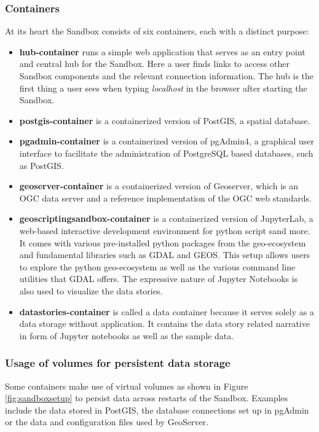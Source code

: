 \documentclass[11pt, a4paper, oneside, parskip=full-]{scrartcl}
\begin{document}
\subsubsection*{Containers}
At its heart the Sandbox consists of six containers, each with a distinct
purpose:

\begin{itemize}
  \item \textbf{hub-container} runs a simple web application that serves as an
  entry point and central hub for the Sandbox. Here a user finds links to access
  other Sandbox components and the relevant connection information. The hub is
  the first thing a user sees when typing \emph{localhost} in the browser after
  starting the Sandbox.
  \item \textbf{postgis-container} is a containerized version of PostGIS, a
  spatial database.
  \item \textbf{pgadmin-container} is a containerized version of pgAdmin4, a
  graphical user interface to facilitate the administration of PostgreSQL based
  databases, such as PostGIS.
  \item \textbf{geoserver-container} is a containerized version of Geoserver,
  which is an OGC data server and a reference implementation of the OGC web
  standards.
  \item \textbf{geoscriptingsandbox-container} is a containerized version of
  JupyterLab, a web-based interactive development environment for python script
  sand more. It comes with various pre-installed python packages from the
  geo-ecosystem and fundamental libraries such as GDAL and GEOS\cite{geos}. This
  setup allows users to explore the python geo-ecosystem as well as the various
  command line utilities that GDAL offers. The expressive nature of Jupyter
  Notebooks is also used to visualize the data stories.
  \item \textbf{datastories-container} is called a data container because it
  serves solely as a data storage without application. It contains the data
  story related narrative in form of Jupyter notebooks as well as the sample
  data.
\end{itemize}

\subsubsection*{Usage of volumes for persistent data storage}
Some containers make use of virtual volumes as shown in Figure
\ref{fig:sandboxsetup} to persist data across restarts of the Sandbox. Examples
include the data stored in PostGIS, the database connections set up in pgAdmin
or the data and configuration files used by GeoServer.
\end{document}
